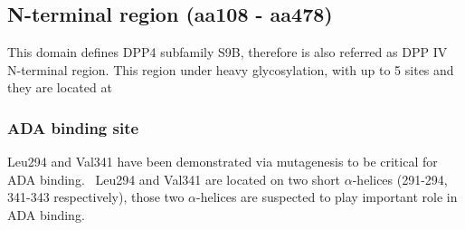\subsection{N-terminal region (aa108 - aa478)}

This domain defines DPP4 subfamily S9B, therefore is also referred as DPP IV N-terminal region. This region under heavy glycosylation, with up to 5 sites and they are located at  

\subsubsection{ADA binding site}
Leu294 and Val341 have been demonstrated via mutagenesis to be critical for ADA binding.~\cite{Abbott_1999} Leu294 and Val341 are located on two short $\alpha$-helices (291-294, 341-343 respectively), those two $\alpha$-helices are suspected to play important role in ADA binding. 